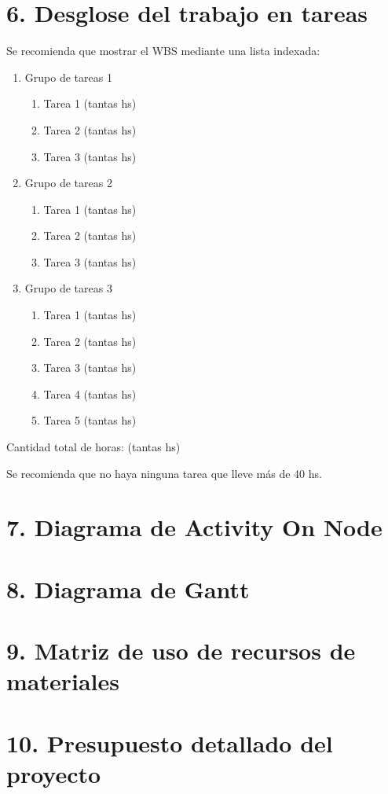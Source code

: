 \documentclass[11pt]{charter}
\begin{document}
\section{6. Desglose del trabajo en tareas}
\label{sec:wbs}

Se recomienda que mostrar el WBS mediante una lista indexada:

\begin{enumerate}
\item Grupo de tareas 1
	\begin{enumerate}
	\item Tarea 1 (tantas hs)
	\item Tarea 2 (tantas hs)
	\item Tarea 3 (tantas hs)
	\end{enumerate}
\item Grupo de tareas 2
	\begin{enumerate}
	\item Tarea 1 (tantas hs)
	\item Tarea 2 (tantas hs)
	\item Tarea 3 (tantas hs)
	\end{enumerate}
	\item Grupo de tareas 3
	\begin{enumerate}
	\item Tarea 1 (tantas hs)
	\item Tarea 2 (tantas hs)
	\item Tarea 3 (tantas hs)
	\item Tarea 4 (tantas hs)
	\item Tarea 5 (tantas hs)
	\end{enumerate}
\end{enumerate}

Cantidad total de horas: (tantas hs)

Se recomienda que no haya ninguna tarea que lleve más de 40 hs. 


\section{7. Diagrama de Activity On Node}
\section{8. Diagrama de Gantt}
\section{9. Matriz de uso de recursos de materiales}
\section{10. Presupuesto detallado del proyecto}
\end{document}
